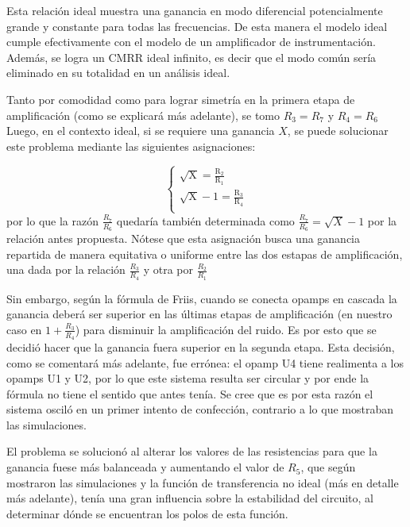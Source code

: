 \documentclass[../../tc_tp3_main.tex]{subfiles}
\begin{document}

Esta relación ideal muestra una ganancia en modo diferencial potencialmente grande y constante para todas las frecuencias. De esta manera el modelo ideal cumple efectivamente con el modelo de un amplificador de instrumentación. Además, se logra un CMRR ideal infinito, es decir que el modo común sería eliminado en su totalidad en un análisis ideal. \par
Tanto por comodidad como para lograr simetría en la primera etapa de amplificación (como se explicará más adelante), se tomo $R_3 = R_7$ y $R_4 = R_6$
Luego, en el contexto ideal, si se requiere una ganancia $X$, se puede solucionar este problema mediante las siguientes asignaciones: \par
 	\begin{equation}
  	   \left\{
	  	    \begin{array}{ll}
		 					\mathrm{\sqrt{X} = \frac{R_2}{R_1} } \\
			 				\mathrm{\sqrt{X} - 1 = \frac{R_3}{R_4}} \\
	     	 \end{array}
	     	\right.
 	\end{equation}
 	por lo que la razón $\frac{R_7}{R_6}$ quedaría también determinada como $\frac{R_7}{R_6} = \sqrt{X} - 1$ por la relación antes propuesta. Nótese que esta asignación busca una ganancia repartida de manera equitativa o uniforme entre las dos estapas de amplificación, una dada por la relación $\frac{R_3}{R_4}$ y otra por $\frac{R_2}{R_1}$\par
 	Sin embargo, según la fórmula de Friis, cuando se conecta opamps en cascada la ganancia deberá ser superior en las últimas etapas de amplificación (en nuestro caso en $1+\frac{R_3}{R_4}$) para disminuir la amplificación del ruido. Es por esto que se decidió hacer que la ganancia fuera superior en la segunda etapa. Esta decisión, como se comentará más adelante, fue errónea: el opamp U4 tiene realimenta a los opamps U1 y U2, por lo que este sistema resulta ser circular y por ende la fórmula no tiene el sentido que antes tenía. Se cree que es por esta razón el sistema osciló en un primer intento de confección, contrario a lo que mostraban las simulaciones.\par
El problema se solucionó al alterar los valores de las resistencias para que la ganancia fuese más balanceada y aumentando el valor de $R_5$, que según mostraron las simulaciones y la función de transferencia no ideal (más en detalle más adelante), tenía una gran influencia sobre la estabilidad del circuito, al determinar dónde se encuentran los polos de esta función.\par
 	
\end{document}
